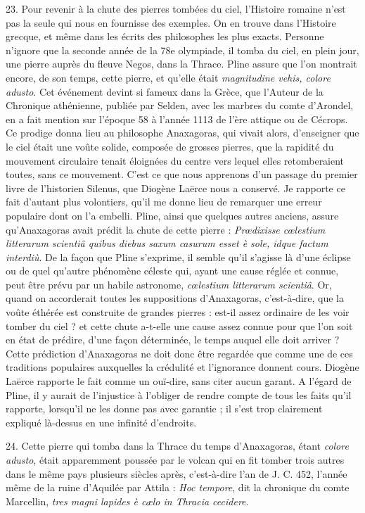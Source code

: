 \documentclass[a4paper, 11pt, oneside, polutonikogreek, french]{article}
\begin{document}
23. Pour revenir à la chute des pierres tombées du ciel, l'Histoire romaine n'est pas la seule qui nous en fournisse des exemples. On en trouve dans l'Histoire grecque, et même dans les écrits des philosophes les plus exacts. Personne n'ignore que la seconde année de la 78e olympiade, il tomba du ciel, en plein jour, une pierre auprès du fleuve Negos, dans la Thrace. Pline assure que l'on montrait encore, de son temps, cette pierre, et qu'elle était \emph{magnitudine vehis, colore adusto}. Cet événement devint si fameux dans la Grèce, que l'Auteur de la Chronique athénienne, publiée par Selden, avec les marbres du comte d'Arondel, en a fait mention sur l'époque 58 à l'année 1113 de l'ère attique ou de Cécrops. Ce prodige donna lieu au philosophe Anaxagoras, qui vivait alors, d'enseigner que le ciel était une voûte solide, composée de grosses pierres, que la rapidité du mouvement circulaire tenait éloignées du centre vers lequel elles retomberaient toutes, sans ce mouvement. C'est ce que nous apprenons d'un passage du premier livre de l'historien Silenus, que Diogène Laërce nous a conservé. Je rapporte ce fait d'autant plus volontiers, qu'il me donne lieu de remarquer une erreur populaire dont on l'a embelli. Pline, ainsi que quelques autres anciens, assure qu'Anaxagoras avait prédit la chute de cette pierre : \emph{Prœdixisse cœlestium litterarum scientiâ quibus diebus saxum casurum esset è sole, idque factum interdiù}. De la façon que Pline s'exprime, il semble qu'il s'agisse là d'une éclipse ou de quel qu’autre phénomène céleste qui, ayant une cause réglée et connue, peut être prévu par un habile astronome, \emph{cœlestium litterarum scientiâ}. Or, quand on accorderait toutes les suppositions d'Anaxagoras, c'est-à-dire, que la voûte éthérée est construite de grandes pierres : est-il assez ordinaire de les voir tomber du ciel ? et cette chute a-t-elle une cause assez connue pour que l'on soit en état de prédire, d'une façon déterminée, le temps auquel elle doit arriver ? Cette prédiction d'Anaxagoras ne doit donc être regardée que comme une de ces traditions populaires auxquelles la crédulité et l'ignorance donnent cours. Diogène Laërce rapporte le fait comme un ouï-dire, sans citer aucun garant. A l'égard de Pline, il y aurait de l'injustice à l'obliger de rendre compte de tous les faits qu'il rapporte, lorsqu’il ne les donne pas avec garantie ; il s'est trop clairement expliqué là-dessus en une infinité d'endroits.

24. Cette pierre qui tomba dans la Thrace du temps d'Anaxagoras, étant \emph{colore adusto}, était apparemment poussée par le volcan qui en fit tomber trois autres dans le même pays plusieurs siècles après, c'est-à-dire l'an de J. C. 452, l'année même de la ruine d'Aquilée par Attila : \emph{Hoc tempore}, dit la chronique du comte Marcellin, \emph{tres magni lapides è cælo in Thracia cecidere}.
\end{document}
